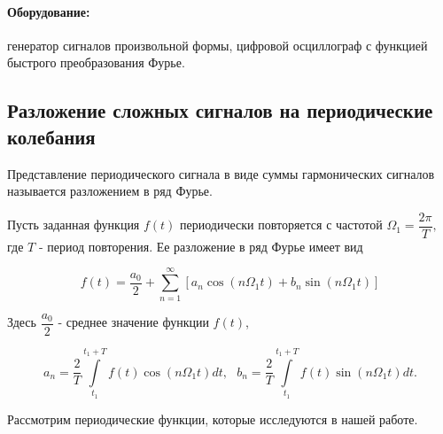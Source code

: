 \documentclass[a4paper,12pt]{article} %
\begin{document}
\paragraph{Оборудование:} генератор сигналов произвольной формы, цифровой осциллограф с функцией быстрого преобразования Фурье.

\subsection*{Разложение сложных сигналов на периодические колебания}
Представление периодического сигнала в виде суммы гармонических сигналов называется разложением в ряд Фурье.
	
Пусть заданная функция $f(t)$ периодически повторяется с частотой $\Omega_{1}=\dfrac{2\pi}{T},$ где $T$ - период повторения. Ее разложение в ряд Фурье имеет вид

\begin{equation}
    f(t)=\dfrac{a_{0}}{2}+ \sum\limits_{n=1}^\infty [a_{n}\cos(n \Omega_{1}t)+b_{n}\sin(n \Omega_{1} t) ]
\label{eq1}
\end{equation}
		
Здесь $\dfrac{a_{0}}{2}$ - среднее значение функции $f(t)$,
	
\begin{equation}
     a_{n}=\dfrac{2}{T}\int\limits_{t_{1}}^{t_{1}+T}f(t)\cos(n \Omega_{1} t)dt, \text{ } b_{n}=\dfrac{2}{T}\int\limits_{t_{1}}^{t_{1}+T}f(t)\sin(n \Omega_{1} t)dt.
     \label{eq2}
\end{equation}
  
Рассмотрим периодические функции, которые исследуются в нашей работе.
	
\end{document}
